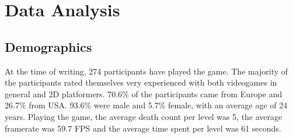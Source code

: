 \section{Data Analysis} \label{data}
\subsection{Demographics}
At the time of writing, 274 participants have played the game. The majority of the participants rated themselves very experienced with both videogames in general and 2D platformers. 70.6\% of the participants came from Europe and 26.7\% from USA. 93.6\% were male and 5.7\% female, with an average age of 24 years. Playing the game, the average death count per level was 5, the average framerate was 59.7 FPS and the average time spent per level was 61 seconds.


